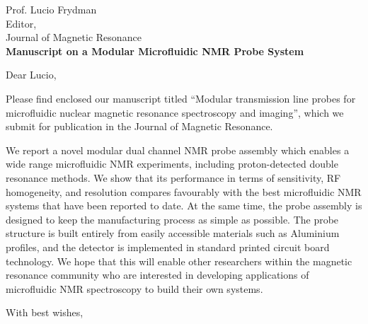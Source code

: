 \documentclass{mu-soton-letter}
\begin{document}
\begin{letter}{Prof. Lucio Frydman\\
  Editor,\\
  Journal of Magnetic Resonance\\[2cm]
  \textbf{Manuscript on a Modular Microfluidic NMR Probe System}}
\vfill
\opening{Dear Lucio,
}
Please find enclosed our manuscript titled
``Modular transmission line probes for microfluidic nuclear
magnetic resonance spectroscopy and imaging'', which we submit for publication
in the Journal of Magnetic Resonance.

 We report a novel modular dual channel
NMR probe assembly which enables a wide range microfluidic NMR experiments,
including proton-detected double resonance methods.
We show that its performance in terms of sensitivity, RF homogeneity, and
resolution compares favourably with the best microfluidic NMR systems that
have been reported to date. At the same time, the
probe assembly is designed to keep the manufacturing process as simple
as possible. The probe structure is built entirely from easily accessible
materials such as Aluminium profiles, and the detector is implemented
in standard printed circuit board technology.
We hope that this will enable other researchers within the magnetic resonance
community who are interested in developing applications
of microfluidic NMR spectroscopy to build their own systems.

\closing{With best wishes,}

\end{letter}
\end{document}
